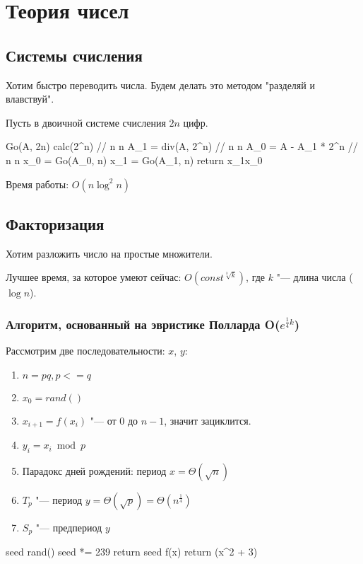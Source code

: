 \chapter{Теория чисел}

\section{Системы счисления}

Хотим быстро переводить числа. Будем делать это методом "разделяй и влавствуй".

Пусть в двоичной системе счисления $2n$ цифр.

\begin{cppcode}
Go(A, 2n) 
	calc(2^n) 			// n \log n
	A_1 = div(A, 2^n)		// n \log n
	A_0 = A - A_1 * 2^n 	// n \log n
	x_0 = Go(A_0, n)
	x_1 = Go(A_1, n)
	return x_1x_0
\end{cppcode}

Время работы: $O(n \log^2 n)$

\section{Факторизация}

Хотим разложить число на простые множители.

Лучшее время, за которое умеют сейчас: $O(const^{\sqrt[3]{k}})$, где $k$ "--- длина числа ($\log n$).

\subsection{Алгоритм, основанный на эвристике Полларда O($e^{\frac{1}{4}k}$)}

Рассмотрим две последовательности: $x$, $y$:
\begin{enumerate}
	\item $n = pq, p <= q$
	\item $x_0 = rand()$
	\item $x_{i+1} = f(x_i)$ "--- от 0 до $n-1$, значит зациклится.
	\item $y_i = x_i \bmod p$
	\item Парадокс дней рождений: период $x = \Theta(\sqrt{n})$
	\item $T_p$ "--- период $y = \Theta(\sqrt{p}) = \Theta(n^{\frac14})$
	\item $S_p$ "--- предпериод $y$
\end{enumerate}

\begin{cppcode}
seed
rand()
	seed *= 239
	return seed
f(x)
	return (x^2 + 3) %
\end{cppcode}

